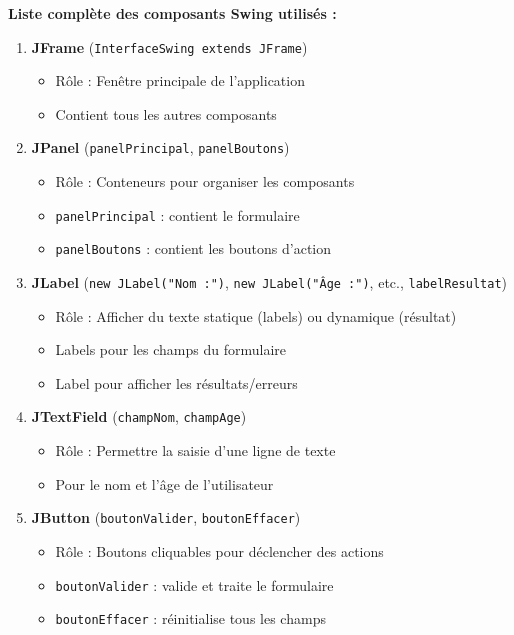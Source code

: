 \documentclass[11pt,a4paper]{article}
\begin{document}
\begin{correctionbox}
\textbf{Liste complète des composants Swing utilisés :}

\begin{enumerate}
    \item \textbf{JFrame} (\texttt{InterfaceSwing extends JFrame})
    \begin{itemize}
        \item Rôle : Fenêtre principale de l'application
        \item Contient tous les autres composants
    \end{itemize}
    
    \item \textbf{JPanel} (\texttt{panelPrincipal}, \texttt{panelBoutons})
    \begin{itemize}
        \item Rôle : Conteneurs pour organiser les composants
        \item \texttt{panelPrincipal} : contient le formulaire
        \item \texttt{panelBoutons} : contient les boutons d'action
    \end{itemize}
    
    \item \textbf{JLabel} (\texttt{new JLabel("Nom :")}, \texttt{new JLabel("Âge :")}, etc., \texttt{labelResultat})
    \begin{itemize}
        \item Rôle : Afficher du texte statique (labels) ou dynamique (résultat)
        \item Labels pour les champs du formulaire
        \item Label pour afficher les résultats/erreurs
    \end{itemize}
    
    \item \textbf{JTextField} (\texttt{champNom}, \texttt{champAge})
    \begin{itemize}
        \item Rôle : Permettre la saisie d'une ligne de texte
        \item Pour le nom et l'âge de l'utilisateur
    \end{itemize}
    
    \item \textbf{JButton} (\texttt{boutonValider}, \texttt{boutonEffacer})
    \begin{itemize}
        \item Rôle : Boutons cliquables pour déclencher des actions
        \item \texttt{boutonValider} : valide et traite le formulaire
        \item \texttt{boutonEffacer} : réinitialise tous les champs
    \end{itemize}
    

\end{enumerate}
\end{correctionbox}
\end{document}
